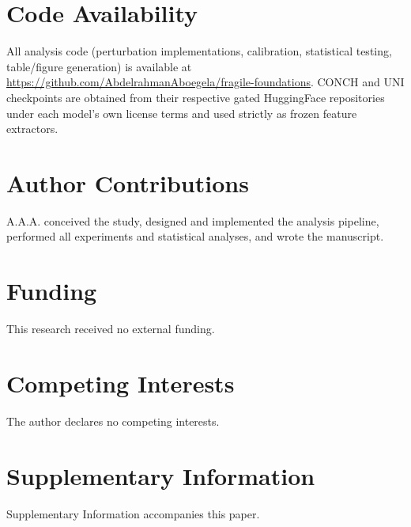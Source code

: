 \documentclass[11pt]{article}
\begin{document}
\section*{Code Availability}
All analysis code (perturbation implementations, calibration, statistical testing, table/figure generation) is available at \url{https://github.com/AbdelrahmanAboegela/fragile-foundations}. CONCH and UNI checkpoints are obtained from their respective gated HuggingFace repositories under each model's own license terms and used strictly as frozen feature extractors.

\section*{Author Contributions}
A.A.A. conceived the study, designed and implemented the analysis pipeline, performed all experiments and statistical analyses, and wrote the manuscript.

\section*{Funding}
This research received no external funding.

\section*{Competing Interests}
The author declares no competing interests.

\section*{Supplementary Information}
Supplementary Information accompanies this paper.



\end{document}

